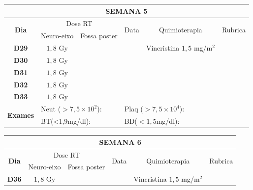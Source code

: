 \documentclass[11pt,a4paper,oldfontcommands]{memoir}
\begin{document}
\begin{center}
\begin{table}[H]
\begin{tabular}{p{1cm}p{2cm}|p{2cm}|p{1cm}|p{4cm}|p{3cm}}
	\hline
	\multicolumn{6}{c}{\textbf{SEMANA 5}}\\
\hline
    \multicolumn{1}{c|}{\multirow{2}{*}{\textbf{Dia}}}&\multicolumn{2}{c|}{Dose RT}&\multicolumn{1}{c|}{\multirow{2}{*}{Data}}&\multicolumn{1}{c|}{\multirow{2}{*}{Quimioterapia}}&\multicolumn{1}{c}{\multirow{2}{*}{Rubrica}} \\
    \cline{2-3}
    \multicolumn{1}{c|}{\multirow{1}{*}{}}&{Neuro-eixo}&{Fossa poster}&& \\
	\hline
	\multicolumn{1}{c|}{\multirow{1}{*}{\textbf{D29}}}&\multicolumn{1}{c|}{\(1,8\) Gy}&&&{Vincristina \(1,5\) mg/m\(^2\)}&\\
    \multicolumn{1}{c|}{\multirow{1}{*}{\textbf{D30}}}&\multicolumn{1}{c|}{\(1,8\) Gy}&&&{}&\\
    \multicolumn{1}{c|}{\multirow{1}{*}{\textbf{D31}}}&\multicolumn{1}{c|}{\(1,8\) Gy}&&&{}&\\
    \multicolumn{1}{c|}{\multirow{1}{*}{\textbf{D32}}}&\multicolumn{1}{c|}{\(1,8\) Gy}&&&{}&\\
    \multicolumn{1}{c|}{\multirow{1}{*}{\textbf{D33}}}&\multicolumn{1}{c|}{\(1,8\) Gy}&&&{}&\\
    \hline
    \multicolumn{1}{c|}{\multirow{2}{*}{\textbf{Exames}}}&\multicolumn{2}{l|}{Neut (\(>7,5\times10^2\)):}&\multicolumn{2}{l|}{Plaq (\(>7,5\times10^4\)):}&\\
    \cline{2-6}
    \multicolumn{1}{c|}{\multirow{2}{*}{{}}}&\multicolumn{2}{l|}{BT(<1,9mg/dl):}&\multicolumn{2}{l|}{BD(\(<1,5\)mg/dl):}&
    \\
    \hline
\end{tabular}
\end{table}
\begin{table}[H]
\begin{tabular}{p{1cm}p{2cm}|p{2cm}|p{1cm}|p{4cm}|p{3cm}}
	\hline
	\multicolumn{6}{c}{\textbf{SEMANA 6}}\\
\hline
    \multicolumn{1}{c|}{\multirow{2}{*}{\textbf{Dia}}}&\multicolumn{2}{c|}{Dose RT}&\multicolumn{1}{c|}{\multirow{2}{*}{Data}}&\multicolumn{1}{c|}{\multirow{2}{*}{Quimioterapia}}&\multicolumn{1}{c}{\multirow{2}{*}{Rubrica}} \\
    \cline{2-3}
    \multicolumn{1}{c|}{\multirow{1}{*}{}}&{Neuro-eixo}&{Fossa poster}&& \\
	\hline
	\multicolumn{1}{c|}{\multirow{1}{*}{\textbf{D36}}}&\multicolumn{1}{c|}{\(1,8\) Gy}&&&{Vincristina \(1,5\) mg/m\(^2\)}&\\

\end{tabular}
\end{table}
\end{center}
\end{document}
